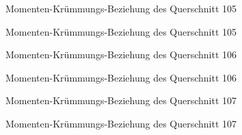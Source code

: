 \documentclass[
  11pt,
  letterpaper,
]{scrreprt}
\begin{document}
\begin{figure}[H]


\caption{\label{fig-qs_105}Momenten-Krümmungs-Beziehung des Querschnitt
105}

\end{figure}%

\begin{figure}[H]


\caption{\label{fig-m_chi_105}Momenten-Krümmungs-Beziehung des
Querschnitt 105}

\end{figure}%

\begin{figure}[H]


\caption{\label{fig-qs_106}Momenten-Krümmungs-Beziehung des Querschnitt
106}

\end{figure}%

\begin{figure}[H]


\caption{\label{fig-m_chi_106}Momenten-Krümmungs-Beziehung des
Querschnitt 106}

\end{figure}%

\begin{figure}[H]


\caption{\label{fig-qs_107}Momenten-Krümmungs-Beziehung des Querschnitt
107}

\end{figure}%

\begin{figure}[H]


\caption{\label{fig-m_chi_107}Momenten-Krümmungs-Beziehung des
Querschnitt 107}

\end{figure}%
\end{document}
